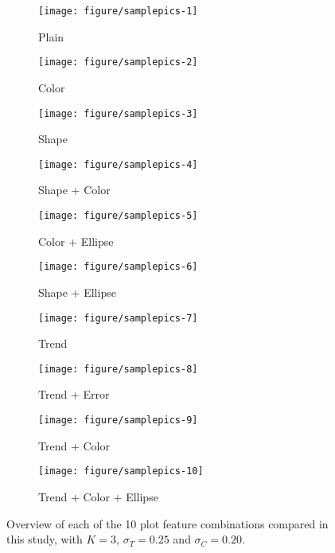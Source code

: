 \documentclass[12pt]{article}\usepackage[]{graphicx}\usepackage[]{color}
\begin{document}
\begin{figure}[ht]
\centering
\begin{subfigure}[t]{0.25\linewidth}
  \caption{Plain}\vspace{-0.15in}
  \texttt{[image: figure/samplepics-1]}
\end{subfigure}
\begin{subfigure}[t]{0.25\linewidth}
  \caption{Color}\vspace{-0.15in}
  \texttt{[image: figure/samplepics-2]}
\end{subfigure}
\begin{subfigure}[t]{0.25\linewidth}
  \caption{Shape}\vspace{-0.15in}
  \texttt{[image: figure/samplepics-3]}
\end{subfigure}
\begin{subfigure}[t]{0.25\linewidth}
  \caption{Shape + Color}\vspace{-0.15in}
  \texttt{[image: figure/samplepics-4]}
\end{subfigure}
\begin{subfigure}[t]{0.25\linewidth}
  \caption{Color + Ellipse}\vspace{-0.15in}
  \texttt{[image: figure/samplepics-5]}
\end{subfigure}
\begin{subfigure}[t]{0.25\linewidth}
  \caption{Shape + Ellipse}\vspace{-0.15in}
  \texttt{[image: figure/samplepics-6]}
\end{subfigure}
\begin{subfigure}[t]{0.25\linewidth}
  \caption{Trend}\vspace{-0.15in}
  \texttt{[image: figure/samplepics-7]}
\end{subfigure}
\begin{subfigure}[t]{0.25\linewidth}
  \caption{Trend + Error }\vspace{-0.15in}
  \texttt{[image: figure/samplepics-8]}
\end{subfigure}
\begin{subfigure}[t]{0.25\linewidth}
  \caption{Trend + Color}\vspace{-0.15in}
  \texttt{[image: figure/samplepics-9]}
\end{subfigure}
\begin{subfigure}[t]{\linewidth}
\centering
  \caption{Trend + Color + Ellipse}\vspace{-0.15in}
  \texttt{[image: figure/samplepics-10]}
\end{subfigure}
\caption[Sample lineup stimuli for each of the 10 aesthetic combinations]{
Overview of each of the 10 plot feature combinations compared in this study, with $K=3$, $\sigma_T=0.25$ and $\sigma_C=0.20$. 
\label{fig:plotExamples}
}
\end{figure}
\end{document}
